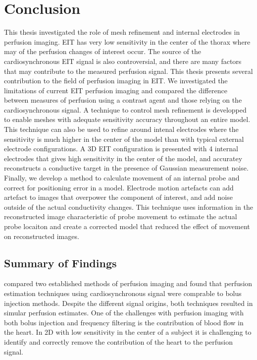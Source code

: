 \chapter{Conclusion}

This thesis investigated the role of mesh refinement and internal electrodes in 
perfusion imaging. 
EIT has very low sensitivity in the center of the thorax where 
may of the perfusion changes of interest occur. 
The source of the cardiosynchronous EIT signal is also 
controversial, and there are many factors that may contribute to 
the measured perfusion signal. 
This thesis presents several contribution to the field of 
perfusion imaging in EIT.
We investigated the limitations of current EIT perfusion imaging
and compared the difference between measures of perfusion using 
a contrast agent and those relying on the cardiosynchronous signal.
A technique to control mesh refinement is developped to enable meshes
with adequate sensitivity accuracy throughout an entire model. This 
technique can also be used to refine around intenal electrodes 
where the sensitivity is much higher in the center of the model than 
with typical external electrode configurations. 
A 3D EIT configuration is presented with 4 internal electrodes that gives high
sensitivity in the center of the model, and accuratey reconstructs a conductive
target in the presence of Gaussian measurement noise.
Finally, we develop a method to calculate movement of 
an internal probe and correct for positioning error in a model. Electrode 
motion artefacts can add artefact to images that overpower the 
component of interest, and add noise outside of the actual 
conductivity changes. This technique uses information in the reconstructed 
image characteristic of probe movement to estimate the actual probe locaiton 
and create a corrected model that reduced the effect of movement on reconstructed 
images. 

\section{Summary of Findings}

 compared two established methods of perfusion 
imaging and found that perfusion estimation techniques using 
cardiosynchronous signal were comprable to bolus injection methods. 
Despite the different signal origins, both techniques 
resulted in simular perfusion estimates. 
One of the challenges with perfusion imaging with both bolus injection and
frequency filtering is the contribution of blood flow in the heart. 
In 2D with low sensitivity in the center of a subject 
it is challenging to identify and correctly remove the contribution 
of the heart to the perfusion signal. 

